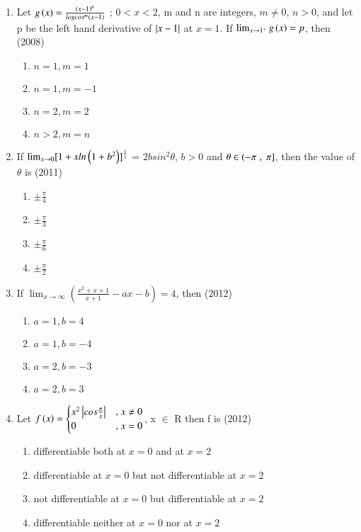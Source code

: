 \documentclass[journal,12pt,twocolumn]{IEEEtran}
\theoremstyle{remark}
\begin{document}
\begin{enumerate}
	\item Let $g\left(x\right)= \frac{\left(x-1\right)^n}{logcos^m\left(x-1\right)}$ ; $0<x<2$, m and n are integers, $m\neq0$, $n>0$, and let p be the left hand derivative of $\left\vert x-1\right\vert$ at $x=1$. If $\lim_{x \to 1^+}
		{g\left(x\right)=p}$, then \hfill{(2008)}
		\begin{enumerate}
			\item $n=1,m=1$
			\item $n=1,m=-1$
			\item $n=2,m=2$
			\item $n>2,m=n$ \\
		\end{enumerate}
	\item If $\lim_{x \to 0}[1+xln\left(1+b^2\right)]^\frac{1}{x}$ = $2bsin^2\theta$, $b>0$ and $\theta \in \left(-\pi\right.,{}\left.\pi\right]$, then the value of $\theta$ is \hfill{(2011)}
		\begin{enumerate}
			\item $\pm\frac{\pi}{4}$
			\item $\pm\frac{\pi}{3}$
			\item $\pm\frac{\pi}{6}$
			\item $\pm\frac{\pi}{2}$ \\
		\end{enumerate}
	\item If $\lim_{ x \to \infty}(\frac{x^2+x+1}{x+1}-ax-b) = 4$, then \hfill{(2012)}
		\begin{enumerate}
			\item $a=1,b=4$
			\item $a=1,b=-4$
			\item $a=2,b=-3$
			\item $a=2,b=3$ \\
		\end{enumerate}
	\item Let $f\left(x\right) =\begin{cases} x^2\left\vert cos \frac{\pi}{x}\right\vert & \text{, } x \neq 0 \\ 0 & \text{, } x = 0 \end{cases}$, x $\in$ R then f is \hfill{(2012)}
		\begin{enumerate}
			\item differentiable both at $x=0$ and at $x=2$
			\item differentiable at $x=0$ but not differentiable at $x=2$
			\item not differentiable at $x=0$ but differentiable at $x=2$
			\item differentiable neither at $x=0$ nor at $x=2$ \\

\end{enumerate}
\end{enumerate}
\end{document}
